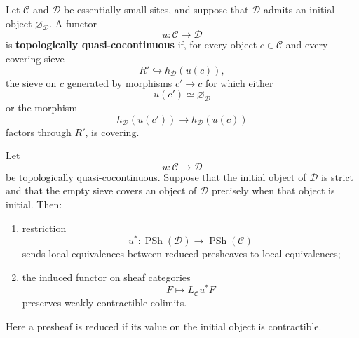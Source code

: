 \begin{definition}
\label{def:topological-quasi-cocontinuity}
Let \(\mathcal C\) and \(\mathcal D\) be essentially small sites, and
suppose that \(\mathcal D\) admits an initial object
\(\varnothing_{\mathcal D}\).  A functor
\[
    u
    \colon
    \mathcal C
    \longrightarrow
    \mathcal D
\]
is \textbf{topologically quasi-cocontinuous} if, for every object
\(c\in\mathcal C\) and every covering sieve
\[
    R'
    \hookrightarrow
    h_{\mathcal D}(u(c)),
\]
the sieve on \(c\) generated by morphisms \(c'\to c\) for which either
\[
    u(c')
    \simeq
    \varnothing_{\mathcal D}
\]
or the morphism
\[
    h_{\mathcal D}(u(c'))
    \longrightarrow
    h_{\mathcal D}(u(c))
\]
factors through \(R'\), is covering.
\end{definition}

\begin{lemma}
\label{lem:quasi-cocontinuous-restriction}
Let
\[
    u
    \colon
    \mathcal C
    \longrightarrow
    \mathcal D
\]
be topologically quasi-cocontinuous.  Suppose that the initial object of
\(\mathcal D\) is strict and that the empty sieve covers an object of
\(\mathcal D\) precisely when that object is initial.  Then:
\begin{enumerate}[label=(\roman*)]
    \item restriction
    \[
        u^*
        \colon
        \operatorname{PSh}(\mathcal D)
        \longrightarrow
        \operatorname{PSh}(\mathcal C)
    \]
    sends local equivalences between reduced presheaves to local
    equivalences;

    \item the induced functor on sheaf categories
    \[
        F
        \longmapsto
        L_{\mathcal C}u^*F
    \]
    preserves weakly contractible colimits.
\end{enumerate}
Here a presheaf is reduced if its value on the initial object is
contractible.
\end{lemma}

